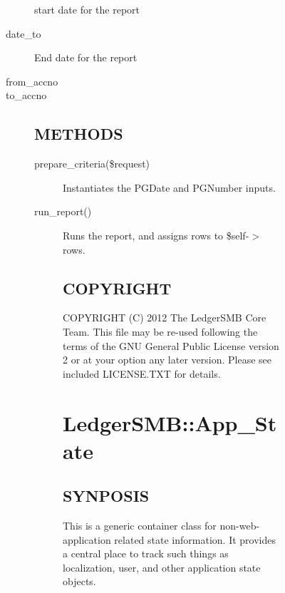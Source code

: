 \begin{description}
\begin{description}
\begin{description}
\begin{description}
start date for the report


\item[{date\_to}] \mbox{}

End date for the report


\item[{from\_accno}] \mbox{}
\item[{to\_accno}] \mbox{}\subsection*{METHODS\label{LedgerSMB::DBObject::Report::co::Caja_Diaria_METHODS}}
\begin{description}

\item[{prepare\_criteria(\$request)}] \mbox{}

Instantiates the PGDate and PGNumber inputs.


\item[{run\_report()}] \mbox{}

Runs the report, and assigns rows to \$self-$>$rows.

\subsection*{COPYRIGHT\label{LedgerSMB::DBObject::Report::co::Caja_Diaria_COPYRIGHT}}


COPYRIGHT (C) 2012 The LedgerSMB Core Team.  This file may be re-used following
the terms of the GNU General Public License version 2 or at your option any
later version.  Please see included LICENSE.TXT for details.

\section{LedgerSMB::App\_State\label{LedgerSMB::App_State}}




\subsection*{SYNPOSIS\label{LedgerSMB::App_State_SYNPOSIS}}


This is a generic container class for non-web-application related state
information.  It provides a central place to track such things as localization,
user, and other application state objects.


\end{description}
\end{description}
\end{description}
\end{description}
\end{description}
